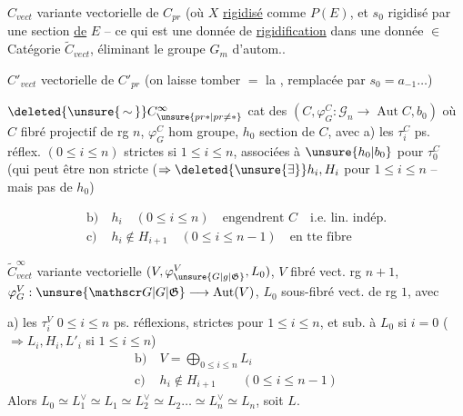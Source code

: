  $C_{vect}$ variante vectorielle de $C_{pr}$ (où $X$ \uline{rigidisé} comme $P(E)$, et $s_0$ rigidisé par une section \uline{de} $E$ -- ce qui  est une donnée de \uline{rigidification} dans une donnée $\in$ Catégorie $\widetilde C_{vect}$, éliminant le groupe $G_m$ d'autom..

$C'_{vect}$  vectorielle de $C'_{pr}$ (on laisse tomber  $=$ la , remplacée par $s_0=a_{-1}\ldots$)

$\deleted{\unsure{\,\sim\,}}C^{\infty}_{\unsure{pr*|pr\ne *}}$ cat des $(C,\varphi_G^C:\mathscr G_n\to\operatorname{Aut} C,b_0)$ où $C$ fibré projectif de rg $n$, $\varphi_G^C$ hom groupe, $h_0$ section de $C$, avec
a) les $\tau_i^C$ ps. réflex. $(0\leq i\leq n)$ strictes si $1\leq i\leq n$, associées à $\unsure{h_0|b_0}$ pour $\tau_0^C$ (qui peut être non stricte ($\Rightarrow \deleted{\unsure{\exists}}h_i,H_i$ pour $1\leq i\leq n$ -- mais pas de $h_0$)


\[
\begin{aligned}
\text{b)}\ & h_i\quad(0\leq i\leq n)\quad \text{engendrent } C\quad\text{i.e. lin. indép.}\\
\text{c)}\ & h_i\notin H_{i+1}\quad(0\leq i\leq n-1)\quad\text{en tte fibre}
\end{aligned}
\]

$\widetilde C^\infty_{vect}$ variante vectorielle $(V,\varphi_{\unsure{G|g|\mathfrak G}}^V,L_0)$, $V$ fibré vect. rg $n+1$, $\varphi_G^V:\unsure{\mathscr G|G|\mathfrak G}\longrightarrow\operatorname{Aut}(V)$, $L_0$ sous-fibré vect. de rg $1$, avec

a) les $\tau_i^V$ $0\leq i\leq n$ ps. réflexions, strictes pour $1\leq i\leq n$, et sub. à $L_0$ si $i=0$ ($\Rightarrow L_i,H_i,L'_i$ si $1\leq i\leq n$)
\[
\begin{aligned}
\text{b)}\ & V=\bigoplus_{0\leq i\leq n} L_i\\
\text{c)}\ & h_i\notin H_{i+1}\qquad(0\leq i\leq n-1)
\end{aligned}
\]
Alors $L_0\simeq L_1^\vee\simeq L_1\simeq L_2^\vee\simeq L_2\ldots\simeq L_n^\vee\simeq L_n$, soit $L$.

